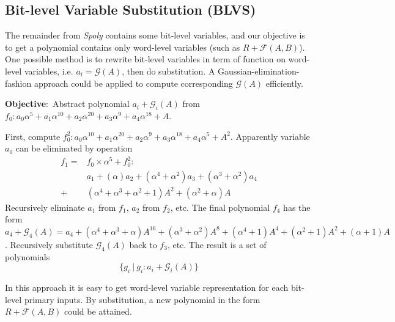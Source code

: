 \subsection{Bit-level Variable Substitution (BLVS)}
\label{sec:blvs}
The remainder from \emph{Spoly} contains some bit-level variables, and our objective is to get a polynomial contains only word-level variables
(such as $R+\mathcal{F}(A,B)$). One possible method is to rewrite bit-level variables in term of function on word-level
variables, i.e. $a_i = \mathcal{G}(A)$, then do substitution. A Gaussian-elimination-fashion approach could be applied to
compute corresponding $\mathcal{G}(A)$ efficiently.

\begin{Example}
{\bf Objective}:\ Abstract polynomial $a_i + \mathcal{G}_i(A)$ from $f_0: a_0\alpha^5+a_1\alpha^{10}+a_2\alpha^{20}+a_3\alpha^9+a_4\alpha^{18}+A$.

First, compute $f_0^2: a_0\alpha^{10}+a_1\alpha^{20}+a_2\alpha^{9}+a_3\alpha^{18}+a_4\alpha^{5}+A^2$. Apparently variable $a_0$ can be
eliminated by operation 
\begin{align}
f_1 =& f_0\times \alpha^5 + f_0^2: \nonumber\\
&a_1+(\alpha)a_2+(\alpha^4+\alpha^2)a_3+(\alpha^3+\alpha^2)a_4\nonumber\\
+&(\alpha^4+\alpha^3+\alpha^2+1)A^2+(\alpha^2+\alpha)A\nonumber
\end{align}
Recursively eliminate $a_1$ from $f_1$, $a_2$ from $f_2$, etc. The final polynomial $f_4$ has the form 
$a_4 + \mathcal{G}_4(A) = a_4+(\alpha^4+\alpha^3+\alpha)A^{16}+(\alpha^3+\alpha^2)A^8+(\alpha^4+1)A^4+(\alpha^2+1)A^2+(\alpha+1)A$. Recursively substitute
$\mathcal{G}_4(A)$ back to $f_3$, etc. The result is a set of polynomials
\begin{displaymath}
\{g_i\ | \ g_i: a_i + \mathcal{G}_i(A)\}
\end{displaymath}
\end{Example}
In this approach it is easy to get word-level variable representation for each bit-level primary inputs. By substitution, a new polynomial in the form $R+\mathcal{F}(A,B)$
could be attained.

